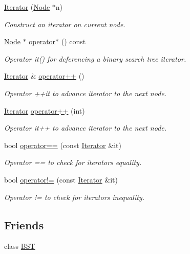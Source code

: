 \begin{DoxyCompactItemize}
\item 
\hyperlink{classBST_1_1Iterator_a469ca54ca68ad46e381e5d86d06a1c37}{Iterator} (\hyperlink{structBST_1_1Node}{Node} $\ast$n)
\begin{DoxyCompactList}\small\item\em Construct an iterator on current node. \end{DoxyCompactList}\item 
\hyperlink{structBST_1_1Node}{Node} $\ast$ \hyperlink{classBST_1_1Iterator_a50c96d5ed9de2db03796635e62b74ca8}{operator$\ast$} () const
\begin{DoxyCompactList}\small\item\em Operator it() for deferencing a binary search tree iterator. \end{DoxyCompactList}\item 
\hyperlink{classBST_1_1Iterator}{Iterator} \& \hyperlink{classBST_1_1Iterator_a65087decb04c6d422a115bbec0be1f2c}{operator++} ()
\begin{DoxyCompactList}\small\item\em Operator ++it to advance iterator to the next node. \end{DoxyCompactList}\item 
\hyperlink{classBST_1_1Iterator}{Iterator} \hyperlink{classBST_1_1Iterator_ab4da22880469dff452dfe4f393cbcd29}{operator++} (int)
\begin{DoxyCompactList}\small\item\em Operator it++ to advance iterator to the next node. \end{DoxyCompactList}\item 
bool \hyperlink{classBST_1_1Iterator_aceb00c5bee59057733bb7fcae044550c}{operator==} (const \hyperlink{classBST_1_1Iterator}{Iterator} \&it)
\begin{DoxyCompactList}\small\item\em Operator == to check for iterators equality. \end{DoxyCompactList}\item 
bool \hyperlink{classBST_1_1Iterator_aaa18a2696f5a0b7d48cc2e7a9c2ce2c1}{operator!=} (const \hyperlink{classBST_1_1Iterator}{Iterator} \&it)
\begin{DoxyCompactList}\small\item\em Operator != to check for iterators inequality. \end{DoxyCompactList}\end{DoxyCompactItemize}
\subsection*{Friends}
\begin{DoxyCompactItemize}
\item 
class \hyperlink{classBST_1_1Iterator_abf74961fd25e946e53e07f358b4bb19a}{B\+ST}
\end{DoxyCompactItemize}


